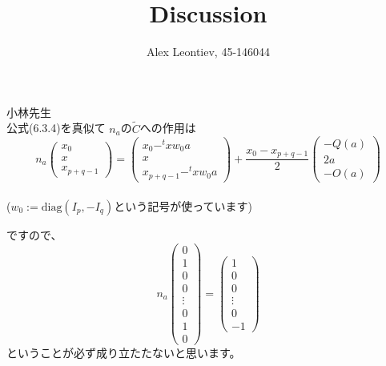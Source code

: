 \documentclass[10pt]{article} %
\author{Alex Leontiev, 45-146044}
\title{Discussion}
\newcommand{\diag}{\mbox{diag}}
\begin{document}
\begin{CJK}{UTF8}{min}
\maketitle
小林先生\\

公式(6.3.4)を真似て
$n_a$の$\tilde{C}$への作用は
\[n_a\begin{pmatrix}x_0\\x\\x_{p+q-1}\end{pmatrix}=\begin{pmatrix}x_0-^txw_0a\\x\\x_{p+q-1}-^txw_0a\end{pmatrix}+
\frac{x_0-x_{p+q-1}}{2}\begin{pmatrix}-Q(a)\\2a\\-O(a)\end{pmatrix}\]\\
($w_0:=\diag(I_p,-I_q)$という記号が使っています)

ですので、
\[n_a\begin{pmatrix}0\\1\\0\\0\\\vdots\\0\\1\\0\end{pmatrix}
=\begin{pmatrix}1\\0\\0\\\vdots\\0\\-1\end{pmatrix}\]
ということが必ず成り立たたないと思います。\\


\end{CJK}
\end{document}
